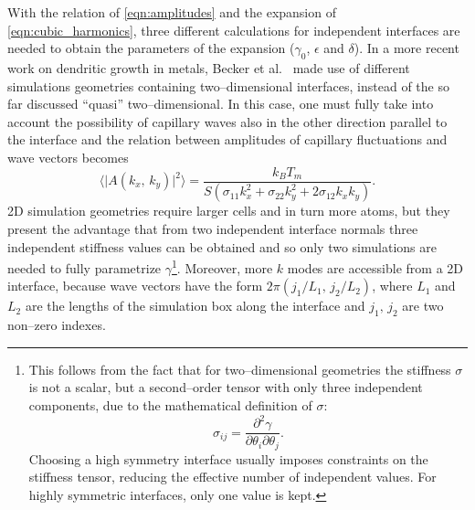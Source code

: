 With the relation of \cref{eqn:amplitudes} and the expansion of \cref{eqn:cubic_harmonics}, three different calculations for independent interfaces are needed to obtain the parameters of the expansion ($\gamma_0$, $\epsilon$ and $\delta$). In a more recent work on dendritic growth in metals, Becker et al.~\cite{BeckerPRL2007} made use of different simulations geometries containing two--dimensional interfaces, instead of the so far discussed ``quasi'' two--dimensional. In this case, one must fully take into account the possibility of capillary waves also in the other direction parallel to the interface and the relation between amplitudes of capillary fluctuations and wave vectors becomes
\begin{equation}
    \langle \lvert A(k_x,\,k_y) \rvert^2 \rangle = \frac{k_B T_m}%
    {S( \sigma_{11}k_x^2 + \sigma_{22}k_y^2 + 2\sigma_{12}k_xk_y)}.
    \label{eqn:amplitudes_xy}
\end{equation}
2D simulation geometries require larger cells and in turn more atoms, but they present the advantage that from two independent interface normals three independent stiffness values can be obtained and so only two simulations are needed to fully parametrize $\gamma$\footnote{This follows from the fact that for two--dimensional geometries the stiffness $\sigma$ is not a scalar, but a second--order tensor with only three independent components, due to the mathematical definition of $\sigma$:\[\sigma_{ij}= \frac{\partial^2 \gamma}{\partial\theta_i\partial\theta_j}.\]%
Choosing a high symmetry interface usually imposes constraints on the stiffness tensor, reducing the effective number of independent values. For highly symmetric interfaces, only one value is kept.}. Moreover, more $k$ modes are accessible from a 2D interface, because wave vectors have the form $2\pi(j_1/L_1,\,j_2/L_2)$, where $L_1$ and $L_2$ are the lengths of the simulation box along the interface and $j_1,\,j_2$ are two non--zero indexes.



